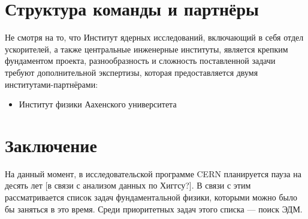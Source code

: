 \documentclass{extarticle}
\begin{document}
\section{Структура команды и партнёры}

Не смотря на то, что Институт ядерных исследований, включающий в себя отдел ускорителей, а также центральные инженерные институты, является крепким фундаментом проекта, разнообразность и сложность поставленной задачи требуют дополнительной экспертизы, которая предоставляется двумя институтами-партнёрами:
\begin{itemize}
	\item Институт физики Аахенского университета
\end{itemize}

		
\section*{Заключение}
На данный момент, в исследовательской программе CERN планируется пауза на десять лет [в связи с анализом данных по Хиггсу?]. В связи с этим рассматривается список задач фундаментальной физики, которыми можно было бы заняться в это время. Среди приоритетных задач этого списка --- поиск ЭДМ. 
\end{document}
